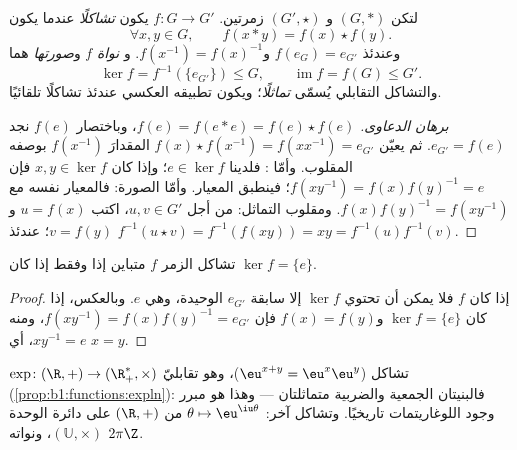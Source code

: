 \begin{definition}\label{def:b1:structures:morphism}
لتكن $(G, *)$ و $(G', \star)$ زمرتين.  $f \colon G \to G'$
يكون \emph{تشاكلًا} عندما يكون
\[
\forall x, y \in G, \qquad f(x * y) = f(x) \star f(y).
\]
وعندئذ $f(e_G) = e_{G'}$ و$f(x^{-1}) = f(x)^{-1}$. و
\emph{نواة} $f$ و\emph{صورتها} هما
\[
\ker f = f^{-1}(\{e_{G'}\}) \leq G,
\qquad
\operatorname{im} f = f(G) \leq G' .
\]
والتشاكل التقابلي يُسمّى \emph{تماثلًا}؛ ويكون تطبيقه العكسي عندئذ
تشاكلًا تلقائيًا.
\end{definition}

\begin{proof}[برهان الدعاوى]
$f(e) = f(e * e) = f(e)\star f(e)$، وباختصار $f(e)$ نجد
$e_{G'} = f(e)$. ثم يعيّن $f(x)\star f(x^{-1}) = f(x x^{-1}) = e_{G'}$
المقدارَ $f(x^{-1})$ بوصفه المقلوب. وأمّا : فلدينا $e \in \ker f$؛ وإذا كان
$x, y \in \ker f$ فإن $f(xy^{-1}) = f(x)f(y)^{-1} = e$؛ فينطبق المعيار.
وأمّا الصورة: فالمعيار نفسه مع $f(x)f(y)^{-1} = f(xy^{-1})$.
ومقلوب التماثل: من أجل $u, v \in G'$، اكتب $u = f(x)$ و$v =
f(y)$؛ عندئذ $f^{-1}(u \star v) = f^{-1}(f(xy)) = xy =
f^{-1}(u) f^{-1}(v)$.
\end{proof}

\begin{proposition}\label{prop:b1:structures:kernel}
تشاكل الزمر $f$ متباين إذا وفقط إذا كان $\ker f =
\{e\}$.
\end{proposition}

\begin{proof}
إذا كان $f$  فلا يمكن أن تحتوي $\ker f$ إلا سابقة $e_{G'}$
الوحيدة، وهي $e$. وبالعكس، إذا كان $\ker f = \{e\}$ و$f(x) =
f(y)$ فإن $f(xy^{-1}) = f(x) f(y)^{-1} = e_{G'}$، ومنه $xy^{-1} = e$،
أي $x = y$.
\end{proof}

\begin{example}\label{ex:b1:structures:expmorphism}
 $\exp \colon (\R, +) \to (\R_+^*, \times)$ تشاكل
($\eu^{x+y} = \eu^x \eu^y$)، وهو تقابليّ
(\cref{prop:b1:functions:expln}): فالبنيتان الجمعية والضربية
متماثلتان --- وهذا هو مبرر وجود اللوغاريتمات تاريخيًا.
وتشاكل آخر: $\theta \mapsto \eu^{\iu\theta}$ من
$(\R, +)$ على دائرة الوحدة $(\mathbb{U}, \times)$، ونواته
$2\pi\Z$.
\end{example}

